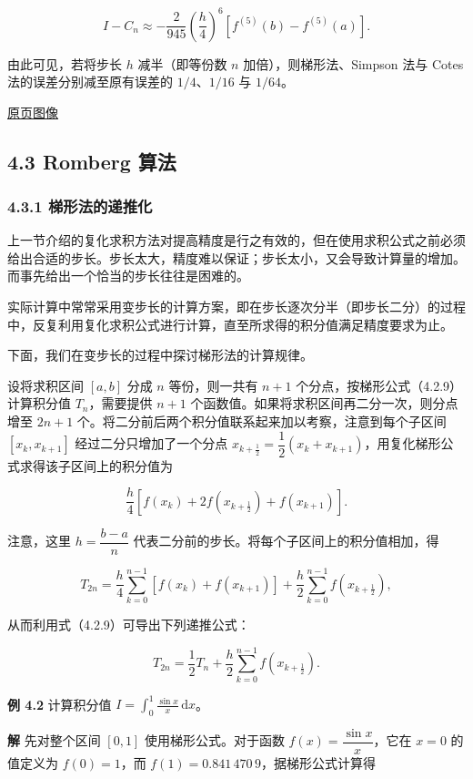\documentclass[
  10pt,
  fontset=fandol]{ctexart}
\begin{document}
\[
I-C_n\approx-\frac2{945}\left(\frac h4\right)^6[f^{(5)}(b)-f^{(5)}(a)].
\tag{4.2.17}
\]

由此可见，若将步长 \(h\) 减半（即等份数 \(n\) 加倍），则梯形法、Simpson 法与 Cotes 法的误差分别减至原有误差的 \(1/4\)、\(1/16\) 与 \(1/64\)。

\href{../../source-images/pdf-101.jpeg}{原页图像}

\subsection{4.3 Romberg 算法}\label{romberg-ux7b97ux6cd5}

\subsubsection{4.3.1 梯形法的递推化}\label{ux68afux5f62ux6cd5ux7684ux9012ux63a8ux5316}

上一节介绍的复化求积方法对提高精度是行之有效的，但在使用求积公式之前必须给出合适的步长。步长太大，精度难以保证；步长太小，又会导致计算量的增加。而事先给出一个恰当的步长往往是困难的。

实际计算中常常采用变步长的计算方案，即在步长逐次分半（即步长二分）的过程中，反复利用复化求积公式进行计算，直至所求得的积分值满足精度要求为止。

下面，我们在变步长的过程中探讨梯形法的计算规律。

设将求积区间 \([a,b]\) 分成 \(n\) 等份，则一共有 \(n+1\) 个分点，按梯形公式（4.2.9）计算积分值 \(T_n\)，需要提供 \(n+1\) 个函数值。如果将求积区间再二分一次，则分点增至 \(2n+1\) 个。将二分前后两个积分值联系起来加以考察，注意到每个子区间 \([x_k,x_{k+1}]\) 经过二分只增加了一个分点 \(x_{k+\frac12}=\dfrac12(x_k+x_{k+1})\)，用复化梯形公式求得该子区间上的积分值为

\[
\frac h4[f(x_k)+2f(x_{k+\frac12})+f(x_{k+1})].
\]

注意，这里 \(h=\dfrac{b-a}{n}\) 代表二分前的步长。将每个子区间上的积分值相加，得

\[
T_{2n}=\frac h4\sum_{k=0}^{n-1}[f(x_k)+f(x_{k+1})]+\frac h2\sum_{k=0}^{n-1}f(x_{k+\frac12}),
\]

从而利用式（4.2.9）可导出下列递推公式：

\[
T_{2n}=\frac12T_n+\frac h2\sum_{k=0}^{n-1}f(x_{k+\frac12}).
\tag{4.3.1}
\]

\textbf{例 4.2} 计算积分值 \(I=\displaystyle\int_0^1\frac{\sin x}{x}\,\mathrm{d}x\)。

\textbf{解} 先对整个区间 \([0,1]\) 使用梯形公式。对于函数 \(f(x)=\dfrac{\sin x}{x}\)，它在 \(x=0\) 的值定义为 \(f(0)=1\)，而 \(f(1)=0.841\,470\,9\)，据梯形公式计算得
\end{document}
